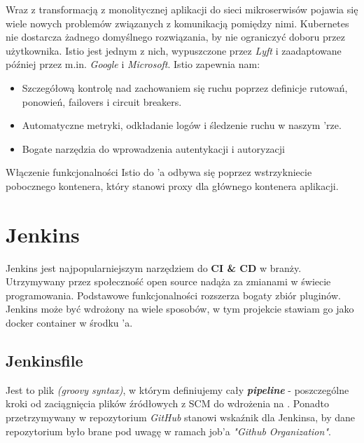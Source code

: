 Wraz z transformacją z monolitycznej aplikacji do sieci mikroserwisów pojawia się wiele nowych problemów związanych z komunikacją pomiędzy nimi.
Kubernetes nie dostarcza żadnego domyślnego rozwiązania, by nie ograniczyć doboru przez użytkownika.
Istio jest jednym z nich, wypuszczone przez \emph{Lyft} i zaadaptowane później przez m.in. \emph{Google} i \emph{Microsoft}. \cite{istio-what}
Istio zapewnia nam:

\begin{itemize}
    \item
    Szczegółową kontrolę nad zachowaniem się ruchu poprzez definicje rutowań, ponowień, failovers i circuit breakers.
    
    \item
    Automatyczne metryki, odkładanie logów i śledzenie ruchu w naszym 'rze.

    \item
    Bogate narzędzia do wprowadzenia autentykacji i autoryzacji
    
\end{itemize} 

Włączenie funkcjonalności Istio do 'a odbywa się poprzez wstrzykniecie pobocznego kontenera, 
który stanowi proxy dla głównego kontenera aplikacji.

\section{Jenkins}

Jenkins jest najpopularniejszym narzędziem do \textbf{CI \& CD} w branży. 
Utrzymywany przez społeczność open source nadąża za zmianami w świecie programowania.
Podstawowe funkcjonalności rozszerza bogaty zbiór pluginów.
Jenkins może być wdrożony na wiele sposobów, w tym projekcie stawiam go jako docker container w środku 'a. 

\subsection{Jenkinsfile}
Jest to plik \emph{(groovy syntax)}, w którym definiujemy cały \textbf{\emph{pipeline}} - poszczególne kroki od zaciągnięcia plików źródłowych z SCM do wdrożenia na .
Ponadto przetrzymywany w repozytorium \emph{GitHub} stanowi wskaźnik dla Jenkinsa, by dane repozytorium było brane pod uwagę w ramach job'a \emph{"Github Organization"}.

